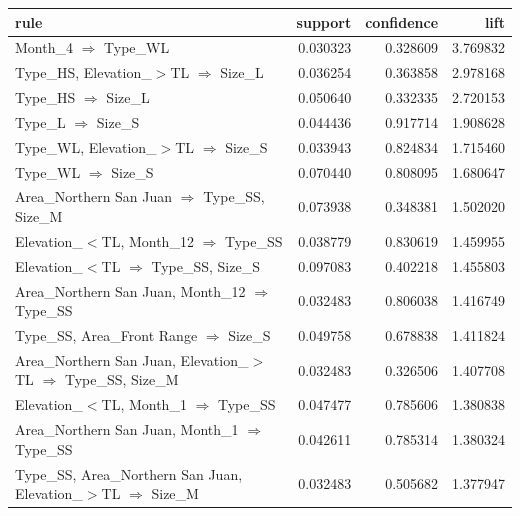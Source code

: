 \begin{tabular}{lrrr}
\toprule
rule & support & confidence & lift \\
\midrule
Month\_4 $\Rightarrow$ Type\_WL & 0.030323 & 0.328609 & 3.769832 \\
Type\_HS, Elevation\_$>$TL $\Rightarrow$ Size\_L & 0.036254 & 0.363858 & 2.978168 \\
Type\_HS $\Rightarrow$ Size\_L & 0.050640 & 0.332335 & 2.720153 \\
Type\_L $\Rightarrow$ Size\_S & 0.044436 & 0.917714 & 1.908628 \\
Type\_WL, Elevation\_$>$TL $\Rightarrow$ Size\_S & 0.033943 & 0.824834 & 1.715460 \\
Type\_WL $\Rightarrow$ Size\_S & 0.070440 & 0.808095 & 1.680647 \\
Area\_Northern San Juan $\Rightarrow$ Type\_SS, Size\_M & 0.073938 & 0.348381 & 1.502020 \\
Elevation\_$<$TL, Month\_12 $\Rightarrow$ Type\_SS & 0.038779 & 0.830619 & 1.459955 \\
Elevation\_$<$TL $\Rightarrow$ Type\_SS, Size\_S & 0.097083 & 0.402218 & 1.455803 \\
Area\_Northern San Juan, Month\_12 $\Rightarrow$ Type\_SS & 0.032483 & 0.806038 & 1.416749 \\
Type\_SS, Area\_Front Range $\Rightarrow$ Size\_S & 0.049758 & 0.678838 & 1.411824 \\
Area\_Northern San Juan, Elevation\_$>$TL $\Rightarrow$ Type\_SS, Size\_M & 0.032483 & 0.326506 & 1.407708 \\
Elevation\_$<$TL, Month\_1 $\Rightarrow$ Type\_SS & 0.047477 & 0.785606 & 1.380838 \\
Area\_Northern San Juan, Month\_1 $\Rightarrow$ Type\_SS & 0.042611 & 0.785314 & 1.380324 \\
Type\_SS, Area\_Northern San Juan, Elevation\_$>$TL $\Rightarrow$ Size\_M & 0.032483 & 0.505682 & 1.377947 \\
\bottomrule
\end{tabular}
